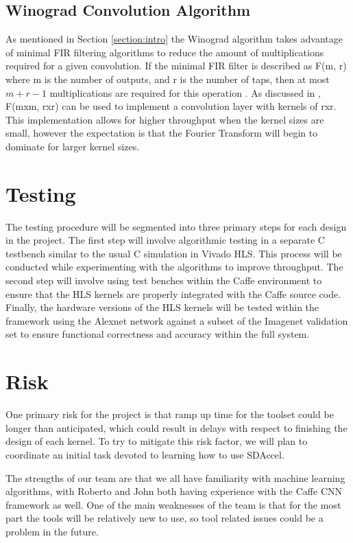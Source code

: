 \documentclass[conference,compsoc]{IEEEtran/IEEEtran}
\begin{document}
\subsection{Winograd Convolution Algorithm}

As mentioned in Section \ref{section:intro} the Winograd algorithm takes advantage of minimal FIR filtering algorithms
to reduce the amount of multiplications required for a given convolution. If the minimal FIR filter is described as
F(m, r) where m is the number of outputs, and r is the number of taps, then at most $m+r-1$ multiplications are
required for this operation \cite{winograd}. As discussed in \cite{winograd}, F(mxm, rxr) can be used to implement a 
convolution layer with kernels of rxr. This implementation allows for higher throughput when the kernel sizes are 
small, however the expectation is that the Fourier Transform will begin to dominate for larger kernel sizes. 

\section{Testing}\label{section:testing}

The testing procedure will be segmented into three primary steps for each design in the project.
The first step will involve algorithmic testing in a separate C testbench similar to the usual C
simulation in Vivado HLS. This process will be conducted while experimenting with the algorithms
to improve throughput. The second step will involve using test benches within the Caffe environment
to ensure that the HLS kernels are properly integrated with the Caffe source code. Finally, the
hardware versions of the HLS kernels will be tested within the framework using the Alexnet network
against a subset of the Imagenet validation set to ensure functional correctness and accuracy
within the full system.

\section{Risk}\label{section:risk}

One primary risk for the project is that ramp up time for the toolset could be longer than
anticipated, which could result in delays with respect to finishing the design of each kernel.
To try to mitigate this risk factor, we will plan to coordinate an initial task devoted to
learning how to use SDAccel.

The strengths of our team are that we all have familiarity with machine learning algorithms,
with Roberto and John both having experience with the Caffe CNN framework as well. One of the
main weaknesses of the team is that for the most part the tools will be relatively new to use,
so tool related issues could be a problem in the future.
\end{document}
